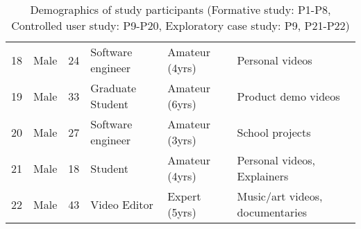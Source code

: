 \begin{table*}[htbp!]
\begin{tabular}{llllll}
        18 & Male & 24 & Software engineer & Amateur (4yrs) & Personal videos \\
        19 & Male & 33 & Graduate Student & Amateur (6yrs) & Product demo videos \\
        20 & Male & 27 &  Software engineer & Amateur (3yrs) & School projects \\
        21 & Male & 18 & Student & Amateur (4yrs) & Personal videos, Explainers \\
        22 & Male & 43 & Video Editor & Expert (5yrs) & Music/art videos, documentaries \\
        \bottomrule
    \end{tabular}
    \caption{Demographics of study participants (Formative study: P1-P8, Controlled user study: P9-P20, Exploratory case study: P9, P21-P22)} 
    \label{tab:participants}
\end{table*}

\clearpage
